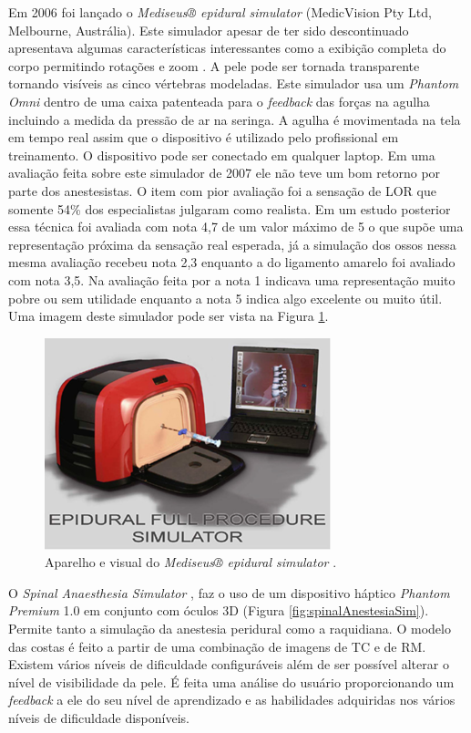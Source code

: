 Em 2006 foi lançado o \textit{Mediseus® epidural simulator} (MedicVision Pty Ltd, Melbourne, Austrália). Este simulador apesar de ter sido descontinuado apresentava algumas características interessantes como a exibição completa do corpo permitindo rotações e zoom \cite{Mayooran2006}. A pele pode ser tornada transparente tornando visíveis as cinco vértebras modeladas. Este simulador usa um \textit{Phantom Omni} dentro de uma caixa patenteada \cite{Brien2007} para o \textit{feedback} das forças na agulha incluindo a medida da pressão de ar na seringa. A agulha é movimentada na tela em tempo real assim que o dispositivo é utilizado pelo profissional em treinamento. O dispositivo pode ser conectado em qualquer laptop. Em uma avaliação feita sobre este simulador de 2007 \cite{Elks2007} ele não teve um bom retorno por parte dos anestesistas. O item com pior avaliação foi a sensação de LOR que somente 54\% dos especialistas julgaram como realista. Em um estudo posterior \cite{Lee2012} essa técnica foi avaliada com nota 4,7 de um valor máximo de 5 o que supõe uma representação próxima da sensação real esperada, já a simulação dos ossos nessa mesma avaliação recebeu nota 2,3 enquanto a do ligamento amarelo foi avaliado com nota 3,5. Na avaliação feita por \textcite{Lee2012} a nota 1 indicava uma representação muito pobre ou sem utilidade enquanto a nota 5 indica algo excelente ou muito útil. Uma imagem deste simulador pode ser vista na Figura \ref{fig:mediseusSimulator}.

\begin{figure}[ht!]
    \centering
    \includegraphics[width=0.6\linewidth]{capitulos/figuras/mediseusSimulator.png} 
    \caption{Aparelho e visual do \textit{Mediseus® epidural simulator}  \cite{Mayooran2006}.}
    \label{fig:mediseusSimulator}
\end{figure}

O \textit{Spinal Anaesthesia Simulator} \cite{Albert2007,Dreifaldt2006}, faz o uso de um dispositivo háptico \textit{Phantom Premium} 1.0 em conjunto com óculos 3D (Figura \ref{fig:spinalAnestesiaSim}). Permite tanto a simulação da anestesia peridural como a raquidiana. O modelo das costas é feito a partir de uma combinação de imagens de \acrfull{TC} e de \acrshort{RM}. Existem vários níveis de dificuldade configuráveis além de ser possível alterar o nível de visibilidade da pele. É feita uma análise do usuário proporcionando um \textit{feedback} a ele do seu nível de aprendizado e as habilidades adquiridas nos vários níveis de dificuldade disponíveis.


